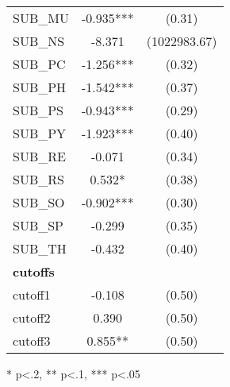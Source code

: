 \begin{table}[H]
\begin{threeparttable}
\begin{tabular}{l c c}
      SUB\_MU          & -0.935*** & (0.31)       \\
      SUB\_NS          & -8.371    & (1022983.67) \\
      SUB\_PC          & -1.256*** & (0.32)       \\
      SUB\_PH          & -1.542*** & (0.37)       \\
      SUB\_PS          & -0.943*** & (0.29)       \\
      SUB\_PY          & -1.923*** & (0.40)       \\
      SUB\_RE          & -0.071    & (0.34)       \\
      SUB\_RS          & 0.532*    & (0.38)       \\
      SUB\_SO          & -0.902*** & (0.30)       \\
      SUB\_SP          & -0.299    & (0.35)       \\
      SUB\_TH          & -0.432    & (0.40)       \\
      \hline
      \textbf{cutoffs} &           &              \\
      cutoff1          & -0.108    & (0.50)       \\
      cutoff2          & 0.390     & (0.50)       \\
      cutoff3          & 0.855**   & (0.50)       \\
      \hline
      \hline
    \end{tabular}
    \begin{tablenotes}
    \item{* p<.2, ** p<.1, *** p<.05}
    \end{tablenotes}
  \end{threeparttable}
\end{table}

\clearpage{}

\newpage{}


